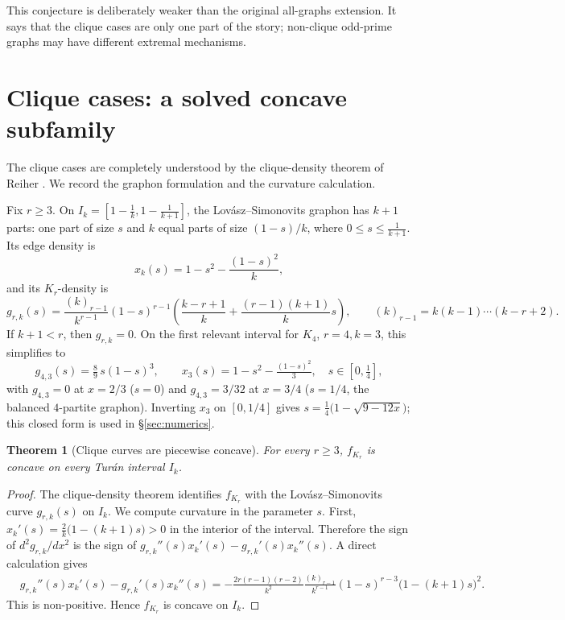 \documentclass[11pt]{amsart}
\newtheorem{theorem}{Theorem}[section]
\theoremstyle{definition}
\newcommand{\1}{\mathbf 1}
\begin{document}
This conjecture is deliberately weaker than the original all-graphs extension.
It says that the clique cases are only one part of the story; non-clique
odd-prime graphs may have different extremal mechanisms.

\section{Clique cases: a solved concave subfamily}
\label{sec:clique}

The clique cases are completely understood by the clique-density theorem of
Reiher \cite{ReiherCliqueDensity}.  We record the graphon formulation and the
curvature calculation.

Fix $r\ge 3$.  On $I_k=\left[1-\frac1k,1-\frac1{k+1}\right]$, the
Lov\'asz--Simonovits graphon has $k+1$ parts: one part of size $s$ and $k$ equal
parts of size $(1-s)/k$, where $0\le s\le \frac1{k+1}$.  Its edge density is
\[
   x_k(s)=1-s^2-\frac{(1-s)^2}{k},
\]
and its $K_r$-density is
\[
   g_{r,k}(s)=
   \frac{(k)_{r-1}}{k^{r-1}}(1-s)^{r-1}
   \left(
      \frac{k-r+1}{k}+\frac{(r-1)(k+1)}{k}s
   \right),
   \qquad (k)_{r-1}=k(k-1)\cdots(k-r+2).
\]
If $k+1<r$, then $g_{r,k}=0$.  On the first relevant interval for $K_4$,
$r=4,k=3$, this simplifies to
\begin{equation}
\label{eq:g43}
   g_{4,3}(s)=\tfrac89\,s(1-s)^3,
   \qquad x_3(s)=1-s^2-\tfrac{(1-s)^2}{3},\quad s\in[0,\tfrac14],
\end{equation}
with $g_{4,3}=0$ at $x=2/3$ ($s=0$) and $g_{4,3}=3/32$ at $x=3/4$ ($s=1/4$,
the balanced $4$-partite graphon).  Inverting $x_3$ on $[0,1/4]$ gives
$s=\tfrac14\bigl(1-\sqrt{9-12x}\bigr)$; this closed form is used in
\S\ref{sec:numerics}.

\begin{theorem}[Clique curves are piecewise concave]
\label{thm:clique-concave}
For every $r\ge 3$, $f_{K_r}$ is concave on every Tur\'an interval $I_k$.
\end{theorem}

\begin{proof}
The clique-density theorem identifies $f_{K_r}$ with the Lov\'asz--Simonovits
curve $g_{r,k}(s)$ on $I_k$.  We compute curvature in the parameter $s$.  First,
$x_k'(s)=\frac{2}{k}\bigl(1-(k+1)s\bigr)>0$ in the interior of the interval.
Therefore the sign of $d^2g_{r,k}/dx^2$ is the sign of
$g_{r,k}''(s)x_k'(s)-g_{r,k}'(s)x_k''(s)$.  A direct calculation gives
\[
\begin{split}
&g_{r,k}''(s)x_k'(s)-g_{r,k}'(s)x_k''(s)
 =-
\frac{2r(r-1)(r-2)}{k^2}
\frac{(k)_{r-1}}{k^{r-1}}
(1-s)^{r-3}\bigl(1-(k+1)s\bigr)^2.
\end{split}
\]
This is non-positive.  Hence $f_{K_r}$ is concave on $I_k$.
\end{proof}
\end{document}
